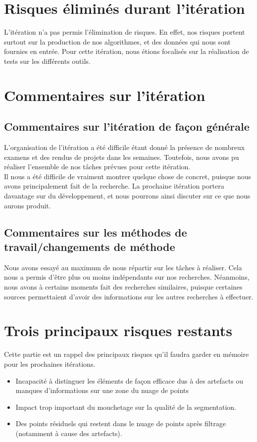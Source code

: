 \documentclass[12pt,titlepage,french]{article}
\begin{document}
\section{Risques éliminés durant l'itération}
L'itération n'a pas permis l'élimination de risques. En effet, nos risques portent surtout sur la production de nos algorithmes, et des données qui nous sont fournies en entrée. Pour cette itération, nous étions focalisés sur la réalisation de tests sur les différents outils.

\section{Commentaires sur l'itération}

\subsection{Commentaires sur l'itération de façon générale}
L'organisation de l'itération a été difficile étant donné la présence de nombreux examens et des rendus de projets dans les semaines. Toutefois, nous avons pu réaliser l'ensemble de nos tâches prévues pour cette itération.\\
Il nous a été difficile de vraiment montrer quelque chose de concret, puisque nous avons principalement fait de la recherche. La prochaine itération portera davantage sur du développement, et nous pourrons ainsi discuter sur ce que nous aurons produit.

\subsection{Commentaires sur les méthodes de travail/changements de méthode}
Nous avons essayé au maximum de nous répartir sur les tâches à réaliser. Cela nous a permis d'être plus ou moins indépendants sur nos recherches. Néanmoins, nous avons à certains moments fait des recherches similaires, puisque certaines sources permettaient d'avoir des informations sur les autres recherches à effectuer.

\section{Trois principaux risques restants}
Cette partie est un rappel des principaux risques qu'il faudra garder en mémoire pour les prochaines itérations.

\begin{itemize}
  \item Incapacité à distinguer les éléments de façon efficace dus à des artefacts ou manques d'informations sur une zone du nuage de points
  \item Impact trop important du mouchetage sur la qualité de la segmentation.
  \item Des points résiduels qui restent dans le nuage de points après filtrage (notamment à cause des artefacts).
\end{itemize}
\end{document}
